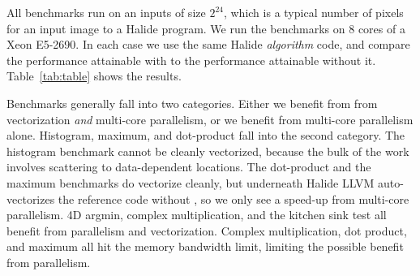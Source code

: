 All benchmarks run on an inputs of size $2^{24}$, which is a typical number of pixels for an input image to a Halide program. We run the benchmarks on 8 cores of a Xeon E5-2690. In each case we use the same Halide \emph{algorithm} code, and compare the performance attainable with  to the performance attainable without it. Table~\ref{tab:table} shows the results.

Benchmarks generally fall into two categories. Either we benefit from from vectorization \emph{and} multi-core parallelism, or we benefit from multi-core parallelism alone. Histogram, maximum, and dot-product fall into the second category. The histogram benchmark cannot be cleanly vectorized, because the bulk of the work involves scattering to data-dependent locations. The dot-product and the maximum benchmarks do vectorize cleanly, but underneath Halide LLVM auto-vectorizes the reference code without , so we only see a speed-up from multi-core parallelism. 4D argmin, complex multiplication, and the kitchen sink test all benefit from parallelism and vectorization. Complex multiplication, dot product, and maximum all hit the memory bandwidth limit, limiting the possible benefit from parallelism.






